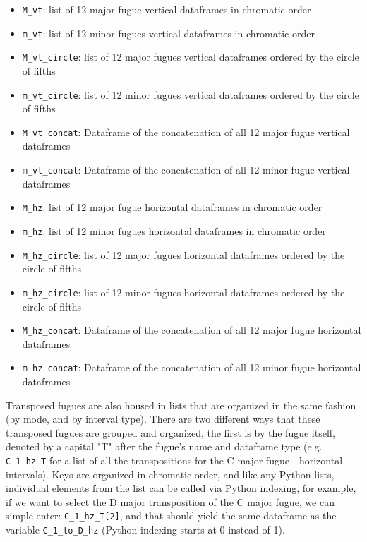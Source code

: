 \begin{itemize}
\tightlist
\item
  \texttt{M\_vt}: list of 12 major fugue vertical dataframes in
  chromatic order
\item
  \texttt{m\_vt}: list of 12 minor fugues vertical dataframes in
  chromatic order
\item
  \texttt{M\_vt\_circle}: list of 12 major fugues vertical dataframes
  ordered by the circle of fifths
\item
  \texttt{m\_vt\_circle}: list of 12 minor fugues vertical dataframes
  ordered by the circle of fifths
\item
  \texttt{M\_vt\_concat}: Dataframe of the concatenation of all 12 major
  fugue vertical dataframes
\item
  \texttt{m\_vt\_concat}: Dataframe of the concatenation of all 12 minor
  fugue vertical dataframes 
\item
  \texttt{M\_hz}: list of 12 major fugue horizontal dataframes in
  chromatic order
\item
  \texttt{m\_hz}: list of 12 minor fugues horizontal dataframes in
  chromatic order
\item
  \texttt{M\_hz\_circle}: list of 12 major fugues horizontal dataframes
  ordered by the circle of fifths
\item
  \texttt{m\_hz\_circle}: list of 12 minor fugues horizontal dataframes
  ordered by the circle of fifths
\item
  \texttt{M\_hz\_concat}: Dataframe of the concatenation of all 12 major
  fugue horizontal dataframes
\item
  \texttt{m\_hz\_concat}: Dataframe of the concatenation of all 12 minor
  fugue horizontal dataframes
\end{itemize}

Transposed fugues are also housed in lists that are organized in the
same fashion (by mode, and by interval type). There are two different
ways that these transposed fugues are grouped and organized, the first
is by the fugue itself, denoted by a capital "T" after the fugue's name
and dataframe type (e.g. \texttt{C\_1\_hz\_T} for a list of all the
transpositions for the C major fugue - horizontal intervals). Keys are
organized in chromatic order, and like any Python lists, individual
elements from the list can be called via Python indexing, for example,
if we want to select the D major transposition of the C major fugue, we
can simple enter: \texttt{C\_1\_hz\_T{[}2{]}}, and that should yield the
same dataframe as the variable \texttt{C\_1\_to\_D\_hz} (Python indexing
starts at 0 instead of 1).

